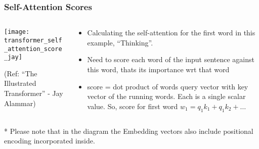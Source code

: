\begin{frame}[fragile]\frametitle{Self-Attention Scores}

\begin{columns}
    \begin{column}[T]{0.5\linewidth}
\begin{center}
\texttt{[image: transformer\_self\_attention\_score\_jay]}


{\tiny (Ref: ``The Illustrated Transformer'' - Jay Alammar)}
\end{center}		

		\end{column}
    \begin{column}[T]{0.5\linewidth}

\begin{itemize}
\item Calculating the self-attention for the first word in this example, ``Thinking''. 
\item Need to score each word of the input sentence against this word, thats its importance wrt that word
\item score = dot product of words query vector with key vector of the running words. Each is a single scalar value. So, score for first word $w_1 = q_1 k_1 + q_1 k_2 + \ldots$
\end{itemize}
    \end{column}
  \end{columns}

* Please note that in the diagram the Embedding vectors also include positional encoding incorporated inside.
\end{frame}

